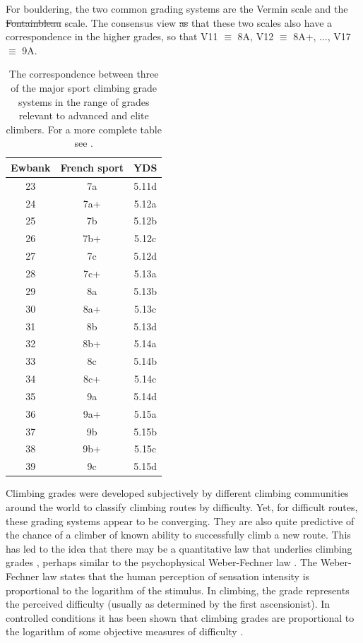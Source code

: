 \documentclass[12pt]{article}
\providecommand{\DIFaddtex}[1]{{\protect\color{blue}\uwave{#1}}} %
\providecommand{\DIFdeltex}[1]{{\protect\color{red}\sout{#1}}}                      %
\providecommand{\DIFaddbegin}{} %
\providecommand{\DIFaddend}{} %
\providecommand{\DIFdelbegin}{} %
\providecommand{\DIFdelend}{} %
\providecommand{\DIFadd}[1]{\texorpdfstring{\DIFaddtex{#1}}{#1}} %
\providecommand{\DIFdel}[1]{\texorpdfstring{\DIFdeltex{#1}}{}} %
\newcommand{\DIFscaledelfig}{0.5}
\newlength{\DIFdelgraphicswidth} %
\newlength{\DIFdelgraphicsheight} %
\newcommand{\DIFaddincludegraphics}[2][]{{\color{blue}\fbox{\DIFOincludegraphics[#1]{#2}}}} %
\newcommand{\DIFdelincludegraphics}[2][]{%
\sbox{\DIFdelgraphicsbox}{\DIFOincludegraphics[#1]{#2}}%
\settoboxwidth{\DIFdelgraphicswidth}{\DIFdelgraphicsbox} %
\settoboxtotalheight{\DIFdelgraphicsheight}{\DIFdelgraphicsbox} %
\scalebox{\DIFscaledelfig}{%
\parbox[b]{\DIFdelgraphicswidth}{\usebox{\DIFdelgraphicsbox}\\[-\baselineskip] \rule{\DIFdelgraphicswidth}{0em}}\llap{\resizebox{\DIFdelgraphicswidth}{\DIFdelgraphicsheight}{%
\setlength{\unitlength}{\DIFdelgraphicswidth}%
\begin{picture}(1,1)%
\thicklines\linethickness{2pt} %
{\color[rgb]{1,0,0}\put(0,0){\framebox(1,1){}}}%
{\color[rgb]{1,0,0}\put(0,0){\line( 1,1){1}}}%
{\color[rgb]{1,0,0}\put(0,1){\line(1,-1){1}}}%
\end{picture}%
}\hspace*{3pt}}} %
} %
\DeclareRobustCommand{\DIFaddbegin}{\DIFOaddbegin \let\includegraphics\DIFaddincludegraphics} %
\DeclareRobustCommand{\DIFaddend}{\DIFOaddend \let\includegraphics\DIFOincludegraphics} %
\DeclareRobustCommand{\DIFdelbegin}{\DIFOdelbegin \let\includegraphics\DIFdelincludegraphics} %
\DeclareRobustCommand{\DIFdelend}{\DIFOaddend \let\includegraphics\DIFOincludegraphics} %
\begin{document}
For bouldering, the two common grading systems are the Vermin scale and the \DIFdelbegin \DIFdel{Fontainbleau }\DIFdelend \DIFaddbegin \DIFadd{Fontainebleau }\DIFaddend scale. The consensus view \DIFdelbegin \DIFdel{as }\DIFdelend \DIFaddbegin \DIFadd{is }\DIFaddend that these two scales also have a correspondence in the higher grades, so that V11 $\equiv$ 8A, V12 $\equiv$ 8A+, $\dots$, V17 $\equiv$ 9A.


\begin{table}
\centering
\begin{tabular}{| c | c | c |}
  \hline
  {\bf Ewbank} & {\bf French sport} & {\bf YDS} \\
  \hline
  23 & 7a & 5.11d \\
  24 & 7a+ & 5.12a \\
  25 & 7b & 5.12b \\
  26 & 7b+ & 5.12c \\
  27 & 7c & 5.12d \\
  28 & 7c+ & 5.13a \\
  29 & 8a & 5.13b \\
  30 & 8a+ & 5.13c \\
  31 & 8b & 5.13d \\
  32 & 8b+ & 5.14a \\
  33 & 8c & 5.14b \\
  34 & 8c+ & 5.14c \\
  35 & 9a & 5.14d \\
  36 & 9a+ & 5.15a \\
  37 & 9b & 5.15b \\
  38 & 9b+ & 5.15c \\
  39 & 9c & 5.15d \\
  \hline
\end{tabular}
\caption{The correspondence between three of the major sport climbing grade systems in the range of grades relevant to advanced and elite climbers. For a more complete table see \citet{draper2015comparative}. }
\label{table1}
\end{table}

Climbing grades were developed subjectively by different climbing communities around the world to classify climbing routes by difficulty. Yet, for difficult routes, these grading systems appear to be converging. They are also quite predictive of the chance of a climber of known ability to successfully climb a new route.  This has led to the idea that there may be a quantitative law that underlies climbing grades \citep{delignieres1993psychophysical}, perhaps similar to the psychophysical Weber-Fechner law \citep{1834pulsu,fechner1860}. The Weber-Fechner law states that the human perception of sensation intensity is proportional to the logarithm of the stimulus.  In climbing, the grade represents the perceived difficulty (usually as determined by the first ascensionist). In controlled conditions it has been shown that climbing grades are proportional to the logarithm of some objective measures of difficulty \citep{delignieres1993psychophysical}.
\end{document}
